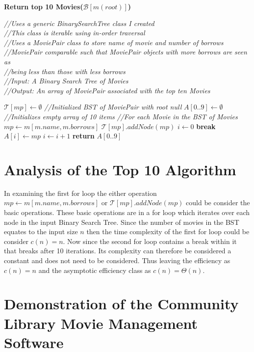 \documentclass[a4paper,12pt]{article}
\begin{document}
\begin{algorithm}
\caption{\textbf{Return top 10 Movies($ \mathcal B[m(root)]$)}}
\emph{//Uses a generic BinarySearchTree class I created}\\
\emph{//This class is iterable using in-order traversal}\\
\emph{//Uses a MoviePair class to store name of movie and number of borrows}\\
\emph{//MoviePair comparable such that MoviePair objects with more borrows are seen as}\\
\emph{//being less than those with less borrows}\\
\emph{//Input: A Binary Search Tree of Movies}\\
\emph{//Output: An array of MoviePair associated with the top ten Movies}
\begin{algorithmic}[1]
\State $\mathcal T[mp] \leftarrow \emptyset $ \emph{//Initialized BST of MoviePair with root null}
\State $A[0..9] \leftarrow \emptyset$ \emph{//Initializes empty array of 10 items}
 \emph{//For each Movie in the BST of Movies}
	\State $mp \leftarrow m[m.name, m.borrows]$ 
	\State $ \mathcal T[mp].addNode(mp)$
\EndFor
\State $i \leftarrow 0$
		\State \textbf{break}
	\EndIf
	\State $A[i] \leftarrow mp$
	\State $i \leftarrow i + 1$
\EndFor
\State \textbf{return} $A[0..9]$
\end{algorithmic}
\end{algorithm}
\section{Analysis of the Top 10 Algorithm}
In examining the first for loop the either operation $mp \leftarrow m[m.name, m.borrows]$ or $ \mathcal T[mp].addNode(mp)$ could be consider the basic operations. These basic operations are in a for loop which iterates over each node in the input Binary Search Tree. Since the number of movies in the BST equates to the input size $n$ then the time complexity of the first for loop could be consider $c(n) = n$. Now since the second for loop contains a break within it that breaks after 10 iterations. Its complexity can therefore be considered a constant and does not need to be considered. Thus leaving the efficiency as $c(n) = n$ and the asymptotic efficiency class as $c(n) = \Theta(n)$.

\newpage

\section{Demonstration of the Community Library Movie Management Software}
\end{document}
